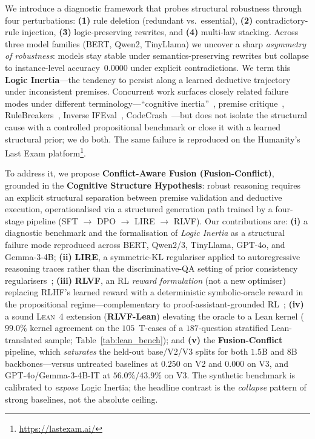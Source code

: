 \documentclass{article}
\begin{document}
We introduce a diagnostic framework that probes structural robustness through four perturbations: \textbf{(1)} rule deletion (redundant vs.\ essential), \textbf{(2)} contradictory-rule injection, \textbf{(3)} logic-preserving rewrites, and \textbf{(4)} multi-law stacking. Across three model families (BERT, Qwen2, TinyLlama) we uncover a sharp \emph{asymmetry of robustness}: models stay stable under semantics-preserving rewrites but collapse to instance-level accuracy~$0.0000$ under explicit contradictions. We term this \textbf{Logic Inertia}---the tendency to persist along a learned deductive trajectory under inconsistent premises. Concurrent work surfaces closely related failure modes under different terminology---``cognitive inertia''~\citep{lee2026cognitive}, premise critique~\citep{premiseCritique2025}, RuleBreakers~\citep{rulebreakers2025}, Inverse IFEval~\citep{inverseIFEval2025}, CodeCrash~\citep{codecrash2025}---but does not isolate the structural cause with a controlled propositional benchmark or close it with a learned structural prior; we do both. The same failure is reproduced on the Humanity's Last Exam platform\footnote{\url{https://lastexam.ai/}}.

To address it, we propose \textbf{Conflict-Aware Fusion (Fusion-Conflict)}, grounded in the \textbf{Cognitive Structure Hypothesis}: robust reasoning requires an explicit structural separation between premise validation and deductive execution, operationalised via a structured generation path trained by a four-stage pipeline (SFT $\to$ DPO $\to$ LIRE $\to$ RLVF). Our contributions are: \textbf{(i)} a diagnostic benchmark and the formalisation of \emph{Logic Inertia} as a structural failure mode reproduced across BERT, Qwen2/3, TinyLlama, GPT-4o, and Gemma-3-4B; \textbf{(ii)} \textbf{LIRE}, a symmetric-KL regulariser applied to autoregressive reasoning traces rather than the discriminative-QA setting of prior consistency regularisers~\citep{asai2020logicaug,li2019logicconsistency}; \textbf{(iii)} \textbf{RLVF}, an RL \emph{reward formulation} (not a new optimiser) replacing RLHF's learned reward with a deterministic symbolic-oracle reward in the propositional regime---complementary to proof-assistant-grounded RL~\citep{deepseekprover2024,leanabell2025,alphaproof2024}; \textbf{(iv)} a sound \textsc{Lean~4} extension (\textbf{RLVF-Lean}) elevating the oracle to a Lean kernel ($99.0\%$ kernel agreement on the $105$~T-cases of a $187$-question stratified Lean-translated sample; Table~\ref{tab:lean_bench}); and \textbf{(v)} the \textbf{Fusion-Conflict} pipeline, which \emph{saturates} the held-out base/V2/V3 splits for both $1.5$B and $8$B backbones---versus untreated baselines at $0.250$ on V2 and $0.000$ on V3, and GPT-4o/Gemma-3-4B-IT at $56.0\%$/$43.9\%$ on V3. The synthetic benchmark is calibrated to \emph{expose} Logic Inertia; the headline contrast is the \emph{collapse} pattern of strong baselines, not the absolute ceiling.
\end{document}
